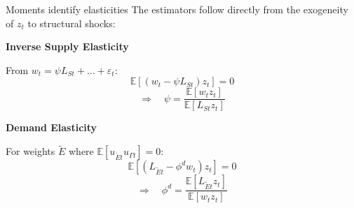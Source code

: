 \documentclass[aspectratio=169,11pt]{beamer}
\begin{document}
\begin{frame}{Moments identify elasticities}
    \vspace{0.5cm}
    \centering
    The estimators follow directly from the exogeneity of $z_t$ to structural shocks:

    \vspace{0.6cm}
    \begin{minipage}{0.48\textwidth}
        \centering
        \textbf{Inverse Supply Elasticity}

        \vspace{0.2cm}
        From $w_t = \psi L_{St} + \dots + \varepsilon_t$:
        \begin{equation*}
            \mathbb{E}[(w_t - \psi L_{St}) z_t] = 0
        \end{equation*}
        \vspace{0.1cm}
        \begin{equation*}
            \Rightarrow \quad \psi = \frac{\mathbb{E}[w_t z_t]}{\mathbb{E}[L_{St} z_t]}
        \end{equation*}
    \end{minipage}
    \hfill
    \begin{minipage}{0.48\textwidth}
        \centering
        \textbf{Demand Elasticity}

        \vspace{0.2cm}
        For weights $\tilde{E}$ where $\mathbb{E}[u_{\tilde{E}t} u_{\Gamma t}] = 0$:
        \begin{equation*}
            \mathbb{E}[(L_{\tilde{E}t} - \phi^d w_t) z_t] = 0
        \end{equation*}
        \vspace{0.1cm}
        \begin{equation*}
            \Rightarrow \quad \phi^d = \frac{\mathbb{E}[L_{\tilde{E}t} z_t]}{\mathbb{E}[w_t z_t]}
        \end{equation*}
    \end{minipage}
    \vspace{0.1cm}
    \hfill \hyperlink{src_propositions}{}
\end{frame}
\end{document}
